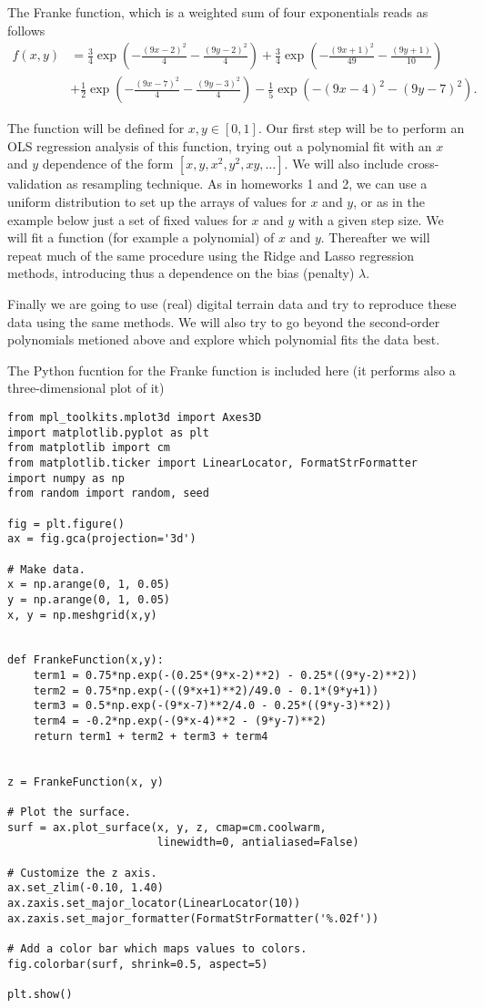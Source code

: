 \documentclass[%
oneside,                 %
final,                   %
10pt]{article}
\begin{document}
The Franke function, which is a weighted sum of four exponentials  reads as follows
\begin{align*}
f(x,y) &= \frac{3}{4}\exp{\left(-\frac{(9x-2)^2}{4} - \frac{(9y-2)^2}{4}\right)}+\frac{3}{4}\exp{\left(-\frac{(9x+1)^2}{49}- \frac{(9y+1)}{10}\right)} \\
&+\frac{1}{2}\exp{\left(-\frac{(9x-7)^2}{4} - \frac{(9y-3)^2}{4}\right)} -\frac{1}{5}\exp{\left(-(9x-4)^2 - (9y-7)^2\right) }.
\end{align*}

The function will be defined for $x,y\in [0,1]$.  Our first step will
be to perform an OLS regression analysis of this function, trying out
a polynomial fit with an $x$ and $y$ dependence of the form $[x, y,
x^2, y^2, xy, \dots]$. We will also include cross-validation as
resampling technique.  As in homeworks 1 and 2, we can use a uniform
distribution to set up the arrays of values for $x$ and $y$, or as in
the example below just a set of fixed 
values for $x$ and $y$ with a given step
size.  We will fit a
function (for example a polynomial) of $x$ and $y$.  Thereafter we
will repeat much of the same procedure using the Ridge and Lasso
regression methods, introducing thus a dependence on the bias
(penalty) $\lambda$.

Finally we are going to use (real) digital terrain data and try to
reproduce these data using the same methods. We will also try to go
beyond the second-order polynomials metioned above and explore 
which polynomial fits the data best.


The Python fucntion for the Franke function is included here (it performs also a three-dimensional plot of it)
\begin{verbatim}
from mpl_toolkits.mplot3d import Axes3D
import matplotlib.pyplot as plt
from matplotlib import cm
from matplotlib.ticker import LinearLocator, FormatStrFormatter
import numpy as np
from random import random, seed

fig = plt.figure()
ax = fig.gca(projection='3d')

# Make data.
x = np.arange(0, 1, 0.05)
y = np.arange(0, 1, 0.05)
x, y = np.meshgrid(x,y)


def FrankeFunction(x,y):
    term1 = 0.75*np.exp(-(0.25*(9*x-2)**2) - 0.25*((9*y-2)**2))
    term2 = 0.75*np.exp(-((9*x+1)**2)/49.0 - 0.1*(9*y+1))
    term3 = 0.5*np.exp(-(9*x-7)**2/4.0 - 0.25*((9*y-3)**2))
    term4 = -0.2*np.exp(-(9*x-4)**2 - (9*y-7)**2)
    return term1 + term2 + term3 + term4


z = FrankeFunction(x, y)

# Plot the surface.
surf = ax.plot_surface(x, y, z, cmap=cm.coolwarm,
                       linewidth=0, antialiased=False)

# Customize the z axis.
ax.set_zlim(-0.10, 1.40)
ax.zaxis.set_major_locator(LinearLocator(10))
ax.zaxis.set_major_formatter(FormatStrFormatter('%.02f'))

# Add a color bar which maps values to colors.
fig.colorbar(surf, shrink=0.5, aspect=5)

plt.show()

\end{verbatim}
\end{document}
